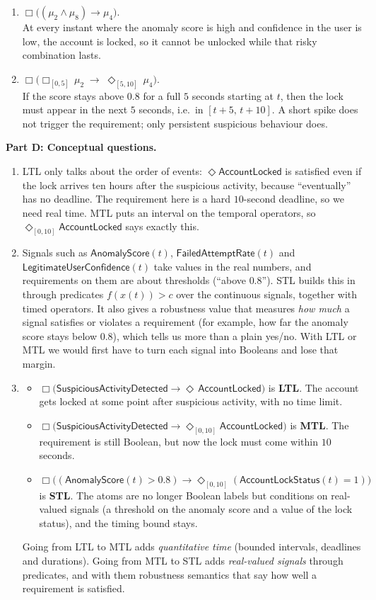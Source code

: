 \documentclass[a4paper, 11pt]{article}
\newcommand{\ap}[1]{\mathsf{#1}}
\newcommand{\AL}{\ap{AccountLocked}}
\newcommand{\SA}{\ap{SuspiciousActivityDetected}}
\newcommand{\AS}{\ap{AnomalyScore}}
\newcommand{\FR}{\ap{FailedAttemptRate}}
\newcommand{\LC}{\ap{LegitimateUserConfidence}}
\newcommand{\LK}{\ap{AccountLockStatus}}
\newcommand{\G}{\Box}
\newcommand{\F}{\Diamond}
\begin{document}
\begin{solution}
\begin{enumerate}
    \item $\G\big((\mu_2\wedge\mu_8) \to \mu_4\big)$. \\
    At every instant where the anomaly score is high and confidence in the user is low, the account is locked, so it cannot be unlocked while that risky combination lasts.

    \item $\G\big(\G_{[0,5]}\,\mu_2 \;\to\; \F_{[5,10]}\,\mu_4\big)$. \\
    If the score stays above $0.8$ for a full $5$ seconds starting at $t$, then the lock must appear in the next $5$ seconds, i.e.\ in $[t+5,\,t+10]$. A short spike does not trigger the requirement; only persistent suspicious behaviour does.
\end{enumerate}

\bigskip
{}
\noindent\textbf{Part D: Conceptual questions.}
\begin{enumerate}
    \item LTL only talks about the order of events: $\F\AL$ is satisfied even if the lock arrives ten hours after the suspicious activity, because ``eventually'' has no deadline. The requirement here is a hard $10$-second deadline, so we need real time. MTL puts an interval on the temporal operators, so $\F_{[0,10]}\AL$ says exactly this.

    \item Signals such as $\AS(t)$, $\FR(t)$ and $\LC(t)$ take values in the real numbers, and requirements on them are about thresholds (``above $0.8$''). STL builds this in through predicates $f(x(t))>c$ over the continuous signals, together with timed operators. It also gives a robustness value that measures \emph{how much} a signal satisfies or violates a requirement (for example, how far the anomaly score stays below $0.8$), which tells us more than a plain yes/no. With LTL or MTL we would first have to turn each signal into Booleans and lose that margin.

    \item
    \begin{itemize}
        \item $\G\big(\SA \to \F\,\AL\big)$ is \textbf{LTL}. The account gets locked at some point after suspicious activity, with no time limit.
        \item $\G\big(\SA \to \F_{[0,10]}\AL\big)$ is \textbf{MTL}. The requirement is still Boolean, but now the lock must come within $10$ seconds.
        \item $\G\big((\AS(t)>0.8) \to \F_{[0,10]}(\LK(t)=1)\big)$ is \textbf{STL}. The atoms are no longer Boolean labels but conditions on real-valued signals (a threshold on the anomaly score and a value of the lock status), and the timing bound stays.
    \end{itemize}
    Going from LTL to MTL adds \emph{quantitative time} (bounded intervals, deadlines and durations). Going from MTL to STL adds \emph{real-valued signals} through predicates, and with them robustness semantics that say how well a requirement is satisfied.
\end{enumerate}


\end{solution}
\end{document}
